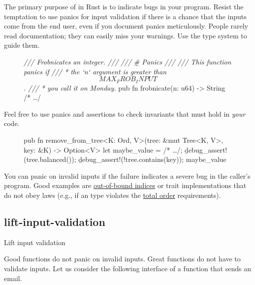 \documentclass{article}
\begin{document}
The primary purpose of \href{https://doc.rust-lang.org/std/macro.panic.html}{} in Rust is to indicate bugs in your program.
Resist the temptation to use panics for input validation if there is a chance that the inputs come from the end user, even if you document panics meticulously.
People rarely read documentation; they can easily miss your warnings.
Use the type system to guide them.

\begin{figure}
\begin{code}[bad]
\emph{/// Frobnicates an integer.
///
/// \b{# Panics}
///
/// This function panics if
/// * the `n` argument is greater than \[MAX_FROB_INPUT\].
/// * you call it on Monday.}
pub fn frobnicate(n: u64) -> String { /* \ldots  */ }
\end{code}
\end{figure}

Feel free to use panics and assertions to check invariants that must hold in \emph{your} code.

\begin{figure}
\begin{code}[good]
pub fn remove_from_tree<K: Ord, V>(tree: &mut Tree<K, V>, key: &K) -> Option<V> {
  let maybe_value = /* \ldots  */;
  \b{debug_assert!}(tree.balanced());
  \b{debug_assert!}(!tree.contains(key));
  maybe_value
}
\end{code}
\end{figure}

You can panic on invalid inputs if the failure indicates a severe bug in the caller's program.
Good examples are \href{https://doc.rust-lang.org/1.62.0/std/ops/trait.Index.html#panics}{out-of-bound indices} or trait implementations that do not obey laws (e.g., if an \href{https://doc.rust-lang.org/1.62.0/std/cmp/trait.Ord.html}{} type violates the \href{https://en.wikipedia.org/wiki/Total_order}{total order} requirements).

\subsection{lift-input-validation}{Lift input validation}

Good functions do not panic on invalid inputs.
Great functions do not have to validate inputs.
Let us consider the following interface of a function that sends an email.
\end{document}
